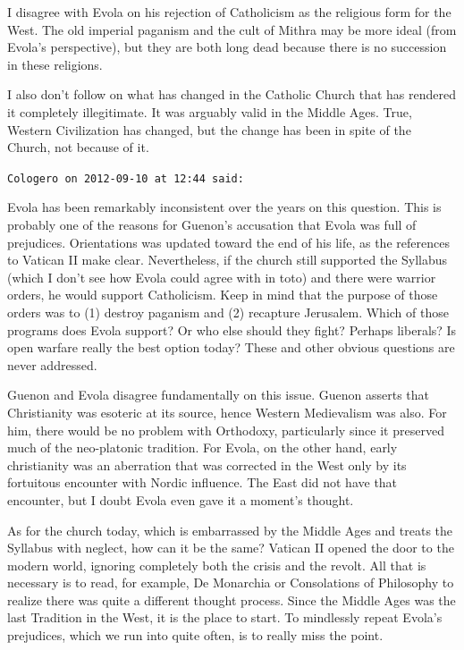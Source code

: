 \begin{footnotesize}
\begin{sffamily}
I disagree with Evola on his rejection of Catholicism as the religious form for the West. The old imperial paganism and the cult of Mithra may be more ideal (from Evola's perspective), but they are both long dead because there is no succession in these religions.

I also don't follow on what has changed in the Catholic Church that has rendered it completely illegitimate. It was arguably valid in the Middle Ages. True, Western Civilization has changed, but the change has been in spite of the Church, not because of it.


\hfill

\texttt{Cologero on 2012-09-10 at 12:44 said: }

Evola has been remarkably inconsistent over the years on this question. This is probably one of the reasons for Guenon's accusation that Evola was full of prejudices. Orientations was updated toward the end of his life, as the references to Vatican II make clear. Nevertheless, if the church still supported the Syllabus (which I don't see how Evola could agree with in toto) and there were warrior orders, he would support Catholicism. Keep in mind that the purpose of those orders was to (1) destroy paganism and (2) recapture Jerusalem. Which of those programs does Evola support? Or who else should they fight? Perhaps liberals? Is open warfare really the best option today? These and other obvious questions are never addressed.

Guenon and Evola disagree fundamentally on this issue. Guenon asserts that Christianity was esoteric at its source, hence Western Medievalism was also. For him, there would be no problem with Orthodoxy, particularly since it preserved much of the neo-platonic tradition. For Evola, on the other hand, early christianity was an aberration that was corrected in the West only by its fortuitous encounter with Nordic influence. The East did not have that encounter, but I doubt Evola even gave it a moment's thought.

As for the church today, which is embarrassed by the Middle Ages and treats the Syllabus with neglect, how can it be the same? Vatican II opened the door to the modern world, ignoring completely both the crisis and the revolt. All that is necessary is to read, for example, De Monarchia or Consolations of Philosophy to realize there was quite a different thought process. Since the Middle Ages was the last Tradition in the West, it is the place to start. To mindlessly repeat Evola's prejudices, which we run into quite often, is to really miss the point.



\end{sffamily}
\end{footnotesize}
